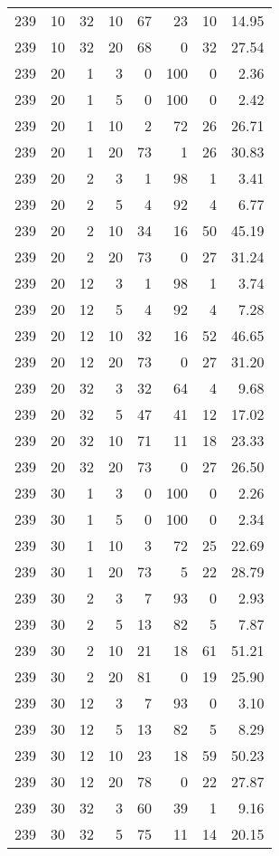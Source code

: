 \begin{tabular}{rrrrrrrr}
239 & 10 & 32 & 10 & 67 & 23 & 10 & 14.95 \\
239 & 10 & 32 & 20 & 68 & 0 & 32 & 27.54 \\
239 & 20 & 1 & 3 & 0 & 100 & 0 & 2.36 \\
239 & 20 & 1 & 5 & 0 & 100 & 0 & 2.42 \\
239 & 20 & 1 & 10 & 2 & 72 & 26 & 26.71 \\
239 & 20 & 1 & 20 & 73 & 1 & 26 & 30.83 \\
239 & 20 & 2 & 3 & 1 & 98 & 1 & 3.41 \\
239 & 20 & 2 & 5 & 4 & 92 & 4 & 6.77 \\
239 & 20 & 2 & 10 & 34 & 16 & 50 & 45.19 \\
239 & 20 & 2 & 20 & 73 & 0 & 27 & 31.24 \\
239 & 20 & 12 & 3 & 1 & 98 & 1 & 3.74 \\
239 & 20 & 12 & 5 & 4 & 92 & 4 & 7.28 \\
239 & 20 & 12 & 10 & 32 & 16 & 52 & 46.65 \\
239 & 20 & 12 & 20 & 73 & 0 & 27 & 31.20 \\
239 & 20 & 32 & 3 & 32 & 64 & 4 & 9.68 \\
239 & 20 & 32 & 5 & 47 & 41 & 12 & 17.02 \\
239 & 20 & 32 & 10 & 71 & 11 & 18 & 23.33 \\
239 & 20 & 32 & 20 & 73 & 0 & 27 & 26.50 \\
239 & 30 & 1 & 3 & 0 & 100 & 0 & 2.26 \\
239 & 30 & 1 & 5 & 0 & 100 & 0 & 2.34 \\
239 & 30 & 1 & 10 & 3 & 72 & 25 & 22.69 \\
239 & 30 & 1 & 20 & 73 & 5 & 22 & 28.79 \\
239 & 30 & 2 & 3 & 7 & 93 & 0 & 2.93 \\
239 & 30 & 2 & 5 & 13 & 82 & 5 & 7.87 \\
239 & 30 & 2 & 10 & 21 & 18 & 61 & 51.21 \\
239 & 30 & 2 & 20 & 81 & 0 & 19 & 25.90 \\
239 & 30 & 12 & 3 & 7 & 93 & 0 & 3.10 \\
239 & 30 & 12 & 5 & 13 & 82 & 5 & 8.29 \\
239 & 30 & 12 & 10 & 23 & 18 & 59 & 50.23 \\
239 & 30 & 12 & 20 & 78 & 0 & 22 & 27.87 \\
239 & 30 & 32 & 3 & 60 & 39 & 1 & 9.16 \\
239 & 30 & 32 & 5 & 75 & 11 & 14 & 20.15 \\

\end{tabular}
